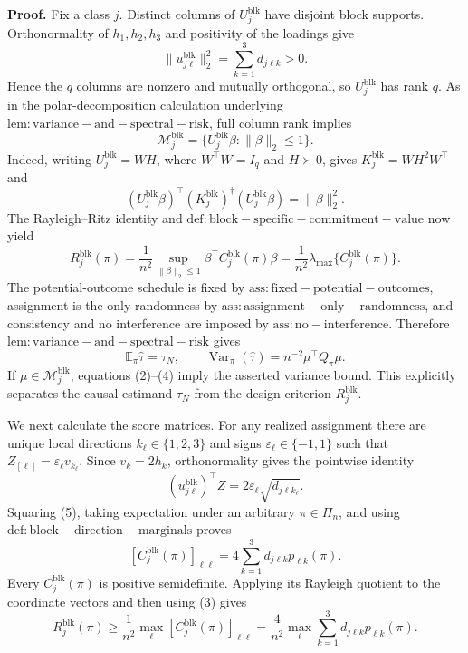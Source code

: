 \textbf{Proof.}
Fix a class \(j\). Distinct columns of \(U_j^{\mathrm{blk}}\) have disjoint block supports. Orthonormality of \(h_1,h_2,h_3\) and positivity of the loadings give
\[
\|u_{j\ell}^{\mathrm{blk}}\|_2^2
=\sum_{k=1}^3d_{j\ell k}>0.
\tag{1}
\]
Hence the \(q\) columns are nonzero and mutually orthogonal, so \(U_j^{\mathrm{blk}}\) has rank \(q\). As in the polar-decomposition calculation underlying \(\mathrm{lem:variance-and-spectral-risk}\), full column rank implies
\[
\mathcal M_j^{\mathrm{blk}}
=\{U_j^{\mathrm{blk}}\beta:\|\beta\|_2\le1\}.
\tag{2}
\]
Indeed, writing \(U_j^{\mathrm{blk}}=WH\), where \(W^\top W=I_q\) and \(H\succ0\), gives \(K_j^{\mathrm{blk}}=WH^2W^\top\) and
\[
(U_j^{\mathrm{blk}}\beta)^\top(K_j^{\mathrm{blk}})^\dagger
(U_j^{\mathrm{blk}}\beta)=\|\beta\|_2^2.
\]
The Rayleigh--Ritz identity and \(\mathrm{def:block-specific-commitment-value}\) now yield
\[
R_j^{\mathrm{blk}}(\pi)
=\frac1{n^2}\sup_{\|\beta\|_2\le1}
\beta^\top C_j^{\mathrm{blk}}(\pi)\beta
=\frac1{n^2}\lambda_{\max}\{C_j^{\mathrm{blk}}(\pi)\}.
\tag{3}
\]
The potential-outcome schedule is fixed by \(\mathrm{ass:fixed-potential-outcomes}\), assignment is the only randomness by \(\mathrm{ass:assignment-only-randomness}\), and consistency and no interference are imposed by \(\mathrm{ass:no-interference}\). Therefore \(\mathrm{lem:variance-and-spectral-risk}\) gives
\[
\mathbb E_\pi\widehat\tau=\tau_N,
\qquad
\operatorname{Var}_\pi(\widehat\tau)=n^{-2}\mu^\top Q_\pi\mu.
\tag{4}
\]
If \(\mu\in\mathcal M_j^{\mathrm{blk}}\), equations (2)--(4) imply the asserted variance bound. This explicitly separates the causal estimand \(\tau_N\) from the design criterion \(R_j^{\mathrm{blk}}\).

We next calculate the score matrices. For any realized assignment there are unique local directions \(k_\ell\in\{1,2,3\}\) and signs \(\varepsilon_\ell\in\{-1,1\}\) such that \(Z_{[\ell]}=\varepsilon_\ell v_{k_\ell}\). Since \(v_k=2h_k\), orthonormality gives the pointwise identity
\[
(u_{j\ell}^{\mathrm{blk}})^\top Z
=2\varepsilon_\ell\sqrt{d_{j\ell k_\ell}}.
\tag{5}
\]
Squaring (5), taking expectation under an arbitrary \(\pi\in\Pi_n\), and using \(\mathrm{def:block-direction-marginals}\) proves
\[
[C_j^{\mathrm{blk}}(\pi)]_{\ell\ell}
=4\sum_{k=1}^3d_{j\ell k}p_{\ell k}(\pi).
\tag{6}
\]
Every \(C_j^{\mathrm{blk}}(\pi)\) is positive semidefinite. Applying its Rayleigh quotient to the coordinate vectors and then using (3) gives
\[
R_j^{\mathrm{blk}}(\pi)
\ge\frac1{n^2}\max_\ell[C_j^{\mathrm{blk}}(\pi)]_{\ell\ell}
=\frac4{n^2}\max_\ell\sum_{k=1}^3d_{j\ell k}p_{\ell k}(\pi).
\tag{7}
\]

